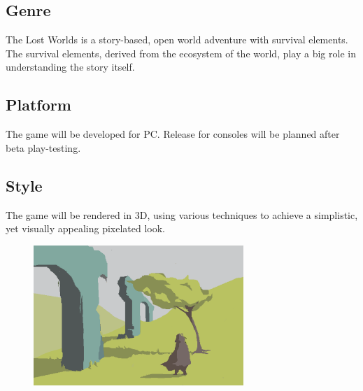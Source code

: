 \documentclass[a4paper,10pt,english]{article}
\begin{document}
\subsection*{Genre}
The Lost Worlds is a story-based, open world adventure with survival elements. The survival elements, derived from the ecosystem of the world, play a big role in understanding the story itself. 

\subsection*{Platform}
The game will be developed for PC. Release for consoles will be planned after beta play-testing.

\subsection*{Style}
The game will be rendered in 3D, using various techniques to achieve a simplistic, yet visually appealing pixelated look.

\vspace{1cm}
\begin{figure}[h]
\centering
\includegraphics[width=300px,height=\textheight,keepaspectratio]{pitch}
\end{figure}
\end{document}

